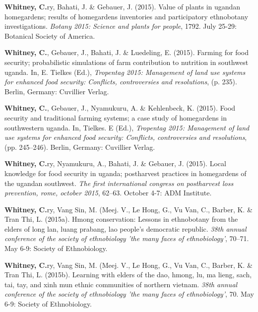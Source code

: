 \documentclass[11pt,a4paper,]{awesome-cv}
\newlength{\cslhangindent}
\newenvironment{CSLReferences}[2] %
 {\begin{list}{}{%
  \setlength{\itemindent}{0pt}
  \setlength{\leftmargin}{0pt}
  \setlength{\parsep}{0pt}
  \ifodd #1
   \setlength{\leftmargin}{\cslhangindent}
   \setlength{\itemindent}{-1\cslhangindent}
  \fi
  \setlength{\itemsep}{#2\baselineskip}}}
 {\end{list}}
\begin{document}
\begin{CSLReferences}{1}{0}
\textbf{Whitney, C.}ry, Bahati, J. \& Gebauer, J. (2015). Value of
plants in ugandan homegardens; results of homegardens inventories and
participatory ethnobotany investigations. \emph{Botany 2015: Science and
plants for people}, 1792. July 25-29: Botanical Society of America.

\textbf{Whitney, C.}, Gebauer, J., Bahati, J. \& Luedeling, E. (2015).
Farming for food security; probabilistic simulations of farm
contribution to nutrition in southwest uganda. In, E. Tielkes (Ed.),
\emph{Tropentag 2015: Management of land use systems for enhanced food
security: Conflicts, controversies and resolutions}, (p. 235). Berlin,
Germany: Cuvillier Verlag.

\textbf{Whitney, C.}, Gebauer, J., Nyamukuru, A. \& Kehlenbeck, K.
(2015). Food security and traditional farming systems; a case study of
homegardens in southwestern uganda. In, Tielkes. E (Ed.),
\emph{Tropentag 2015: Management of land use systems for enhanced food
security: Conflicts, controversies and resolutions}, (pp. 245--246).
Berlin, Germany: Cuvillier Verlag.

\textbf{Whitney, C.}ry, Nyamukuru, A., Bahati, J. \& Gebauer, J. (2015).
Local knowledge for food security in uganda; postharvest practices in
homegardens of the ugandan southwest. \emph{The first international
congress on postharvest loss prevention, rome, october 2015}, 62--63.
October 4-7: ADM Institute.

\textbf{Whitney, C.}ry, Vang Sin, M. (Meej. V., Le Hong, G., Vu Van, C.,
Barber, K. \& Tran Thi, L. (2015a). Hmong conservation: Lessons in
ethnobotany from the elders of long lan, luang prabang, lao people's
democratic republic. \emph{38th annual conference of the society of
ethnobiology 'the many faces of ethnobiology'}, 70--71. May 6-9: Society
of Ethnobiology.

\textbf{Whitney, C.}ry, Vang Sin, M. (Meej. V., Le Hong, G., Vu Van, C.,
Barber, K. \& Tran Thi, L. (2015b). Learning with elders of the dao,
hmong, lu, ma lieng, sach, tai, tay, and xinh mun ethnic communities of
northern vietnam. \emph{38th annual conference of the society of
ethnobiology 'the many faces of ethnobiology'}, 70. May 6-9: Society of
Ethnobiology.


\end{CSLReferences}
\end{document}

